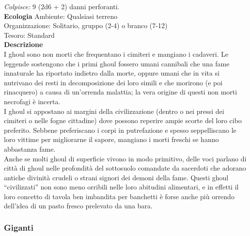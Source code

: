 \begin{multicols}{2}
\emph{Colpisce:} 9 (2d6 + 2) danni perforanti.\\
\textbf{Ecologia}
Ambiente: Qualsiasi terreno\\
Organizzazione: Solitario, gruppo (2-4) o branco (7-12)\\
Tesoro: Standard\\
\textbf{Descrizione}\\
I ghoul sono non morti che frequentano i cimiteri e mangiano i cadaveri. Le leggende sostengono che i primi ghoul fossero umani cannibali che una fame innaturale ha riportato indietro dalla morte, oppure umani che in vita si nutrivano dei resti in decomposizione dei loro simili e che morirono (e poi rinacquero) a causa di un'orrenda malattia; la vera origine di questi non morti necrofagi è incerta.\\
I ghoul si appostano ai margini della civilizzazione (dentro o nei pressi dei cimiteri o nelle fogne cittadine) dove possono reperire ampie scorte del loro cibo preferito. Sebbene preferiscano i corpi in putrefazione e spesso seppelliscano le loro vittime per migliorarne il sapore, mangiano i morti freschi se hanno abbastanza fame.\\

Anche se molti ghoul di superficie vivono in modo primitivo, delle voci parlano di città di ghoul nelle profondità del sottosuolo comandate da sacerdoti che adorano antiche divinità crudeli o strani signori dei demoni della fame. Questi ghoul “civilizzati” non sono meno orribili nelle loro abitudini alimentari, e in effetti il loro concetto di tavola ben imbandita per banchetti è forse anche più orrendo dell'idea di un pasto fresco prelevato da una bara.\\

\subsubsection{Giganti}


\end{multicols}
